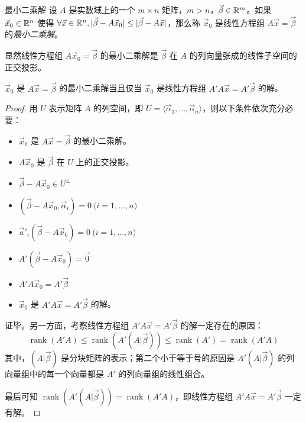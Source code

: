 \begin{definition}{最小二乘解}
	设 $A$ 是实数域上的一个 $m \times n$ 矩阵，$m > n$，$\vec \beta \in \mathbb R^m$。如果 $\vec x_0 \in \mathbb R^n$ 使得 $\forall \vec x \in \mathbb R^n, |\vec \beta - A \vec x_0| \le |\vec \beta - A \vec x|$，那么称 $\vec x_0$ 是线性方程组 $A \vec x = \vec \beta$ 的\emph{最小二乘解}。
\end{definition}

显然线性方程组 $A \vec x_0 = \vec \beta$ 的最小二乘解是 $\vec \beta$ 在 $A$ 的列向量张成的线性子空间的正交投影。

\begin{theorem}
	$\vec x_0$ 是 $A \vec x = \vec \beta$ 的最小二乘解当且仅当 $\vec x_0$ 是线性方程组 $A'A \vec x = A' \vec \beta$ 的解。
\end{theorem}

\begin{proof}
	用 $U$ 表示矩阵 $A$ 的列空间，即 $U = \langle \vec \alpha_1, \ldots, \vec \alpha_n \rangle$，则以下条件依次充分必要：
	\begin{itemize}
		\item $\vec x_0$ 是 $A \vec x = \vec \beta$ 的最小二乘解。
		\item $A \vec x_0$ 是 $\vec \beta$ 在 $U$ 上的正交投影。
		\item $\vec \beta - A \vec x_0 \in U^\perp$
		\item $(\vec \beta - A \vec x_0, \vec \alpha_i) = 0 \pod{i = 1, \ldots, n}$
		\item $\vec a'_i (\vec \beta - A \vec x_0) = 0 \pod{i = 1, \ldots, n}$
		\item $A'(\vec \beta - A \vec x_0) = \vec 0$
		\item $A'A \vec x_0 = A' \vec \beta$
		\item $\vec x_0$ 是 $A'A \vec x = A' \vec \beta$ 的解。
	\end{itemize}

	证毕。另一方面，考察线性方程组 $A'A \vec x = A' \vec \beta$ 的解一定存在的原因：
	$$
	\operatorname{rank}(A'A) \le \operatorname{rank}(A'(A|\vec \beta)) \le \operatorname{rank}(A') = \operatorname{rank}(A'A)
	$$
	其中，$(A|\vec \beta)$ 是分块矩阵的表示；第二个小于等于号的原因是 $A'(A|\vec \beta)$ 的列向量组中的每一个向量都是 $A'$ 的列向量组的线性组合。

	最后可知 $\operatorname{rank}(A'(A|\vec \beta)) = \operatorname{rank}(A'A)$，即线性方程组 $A'A \vec x = A' \vec \beta$ 一定有解。
\end{proof}